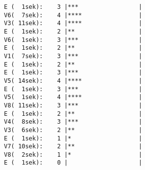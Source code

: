 \begin{ausgabe}[H]
\begin{scriptsize}
\begin{spacing}{1.0}
\begin{verbatim}
E (  1sek):    3 |***                 |
V6(  7sek):    4 |****                |
V3( 11sek):    4 |****                |
E (  1sek):    2 |**                  |
V6(  1sek):    3 |***                 |
E (  1sek):    2 |**                  |
V1(  7sek):    3 |***                 |
E (  1sek):    2 |**                  |
E (  1sek):    3 |***                 |
V5( 14sek):    4 |****                |
E (  1sek):    3 |***                 |
V5(  1sek):    4 |****                |
V8( 11sek):    3 |***                 |
E (  1sek):    2 |**                  |
V4(  8sek):    3 |***                 |
V3(  6sek):    2 |**                  |
E (  1sek):    1 |*                   |
V7( 10sek):    2 |**                  |
V8(  2sek):    1 |*                   |
E (  1sek):    0 |                    |
\end{verbatim}
\caption{Erzeuger wartet 1 ZE, 8 zufällige Verbraucher}
\label{out:esv2}
\end{spacing}
\end{scriptsize}
\end{ausgabe}

